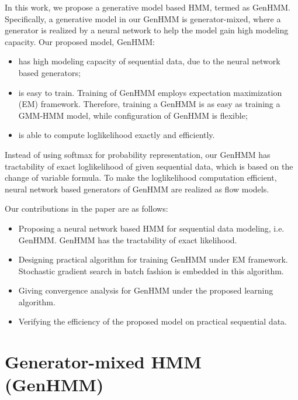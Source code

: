 \documentclass{ecai}
\begin{document}
In this work, we propose a generative model based HMM, termed as GenHMM. Specifically, a generative model in our GenHMM is generator-mixed, where a generator is realized by a neural network to help the model gain high modeling capacity.
Our proposed model, GenHMM:
\begin{itemize}
  \item has high modeling capacity of sequential data, due to the neural network based generators;
\item is easy to train. Training of GenHMM employs expectation maximization (EM) framework. Therefore, training a GenHMM is as easy as training a GMM-HMM model, while configuration of GenHMM is flexible;
\item is able to compute loglikelihood exactly and efficiently.
\end{itemize}
Instead of using softmax for probability representation, our GenHMM has tractability of exact loglikelihood of given sequential data, which is based on the change of variable formula. To make the loglikelihood computation efficient, neural network based generators of GenHMM are realized as flow models. 

Our contributions in the paper are as follows:
\begin{itemize}
\item Proposing a neural network based HMM for sequential data modeling, i.e. GenHMM. GenHMM has the tractability of exact likelihood.
\item Designing practical algorithm for training GenHMM under EM framework. Stochastic gradient  search in batch fashion is embedded in this algorithm.
\item Giving convergence analysis for GenHMM under the proposed learning algorithm.
\item Verifying the efficiency of the proposed model on practical sequential data.
\end{itemize}



\section{Generator-mixed HMM (GenHMM)}
\end{document}
